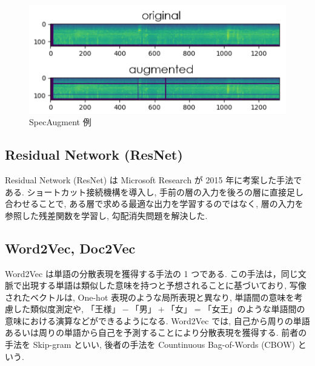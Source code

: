 \documentclass[twocolumn]{jarticle}     %
\begin{document}
\begin{figure}[tb]
  \centering
  \includegraphics[scale=0.5]{spec_aug.png}
  \caption{SpecAugment 例}
  \label{fig:spec_aug}
\end{figure}



\subsection{Residual Network (ResNet)}
Residual Network (ResNet) \cite{DBLP:journals/corr/HeZRS15} は Microsoft Research が 2015 年に考案した手法である. ショートカット接続機構を導入し, 手前の層の入力を後ろの層に直接足し合わせることで, ある層で求める最適な出力を学習するのではなく, 層の入力を参照した残差関数を学習し, 勾配消失問題を解決した.

\subsection{Word2Vec, Doc2Vec}
Word2Vec \cite{word2vec} は単語の分散表現を獲得する手法の 1 つである.
この手法は，同じ文脈で出現する単語は類似した意味を持つと予想されることに基づいており,
写像されたベクトルは, One-hot 表現のような局所表現と異なり, 単語間の意味を考慮した類似度測定や, $「王様」-「男」+「女」=「女王」$のような単語間の意味における演算などができるようになる.
Word2Vec では, 自己から周りの単語あるいは周りの単語から自己を予測することにより分散表現を獲得する.
前者の手法を Skip-gram といい, 後者の手法を Countinuous Bag-of-Words (CBOW) という.
\end{document}
